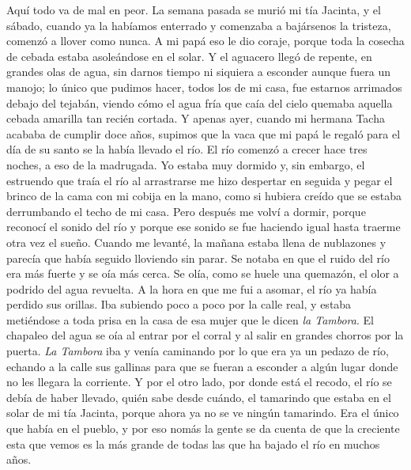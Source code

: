 	Aquí todo va de mal en peor. La semana pasada se murió mi tía Jacinta, y el sábado, cuando ya la habíamos enterrado y comenzaba a bajársenos la tristeza, comenzó a llover como nunca. A mi papá eso le dio coraje, porque toda la cosecha de cebada estaba asoleándose en el solar. Y el aguacero llegó de repente, en grandes olas de agua, sin darnos tiempo ni siquiera a esconder aunque fuera un manojo; lo único que pudimos hacer, todos los de mi casa, fue estarnos arrimados debajo del tejabán, viendo cómo el agua fría que caía del cielo quemaba aquella cebada amarilla tan recién cortada.
\pend
%
\pstart
	Y apenas ayer, cuando mi hermana Tacha acababa de cumplir doce años, supimos que la vaca que mi papá le regaló para el día de su santo se la había llevado el río.
\pend
%
\pstart
	El río comenzó a crecer hace tres noches, a eso de la madrugada. Yo estaba muy dormido y, sin embargo, el estruendo que traía el río al arrastrarse me hizo despertar en seguida y pegar el brinco de la cama con mi cobija en la mano, como si hubiera creído que se estaba derrumbando el techo de mi casa. Pero después me volví a dormir, porque reconocí el sonido del río y porque ese sonido se fue haciendo igual hasta traerme otra vez el sueño.
\pend
%
\pstart
	Cuando me levanté, la mañana estaba llena de nublazones y parecía que había seguido lloviendo sin parar. Se notaba en que el ruido del río era más fuerte y se oía más cerca. Se olía, como se huele una quemazón, el olor a podrido del agua revuelta.
\pend
%
\pstart
	A la hora en que me fui a asomar, el río ya había perdido sus orillas. Iba subiendo poco a poco por la calle real, y estaba metiéndose a toda prisa en la casa de esa mujer que le dicen \textit{la Tambora}. El chapaleo del agua se oía al entrar por el corral y al salir en grandes chorros por la puerta. \textit{La Tambora} iba y venía caminando por lo que era ya un pedazo de río, echando a la calle sus gallinas para que se fueran a esconder a algún lugar donde no les llegara la corriente.
\pend
%
\pstart
	Y por el otro lado, por donde está el recodo, el río se debía de haber llevado, quién sabe desde cuándo, el tamarindo que estaba en el solar de mi tía Jacinta, porque ahora ya no se ve ningún tamarindo. Era el único que había en el pueblo, y por eso nomás la gente se da cuenta de que la creciente esta que vemos es la más grande de todas las que ha bajado el río en muchos años.
